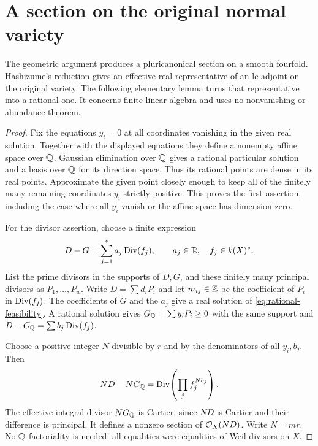 \section{A section on the original normal variety}\label{sec:conclusion}

The geometric argument produces a pluricanonical section on a smooth
fourfold. Hashizume's reduction gives an effective real representative
of an lc adjoint on the original variety. The following elementary
lemma turns that representative into a rational one. It concerns
finite linear algebra and uses no nonvanishing or abundance theorem.


\begin{proof}
Fix the equations $y_i=0$ at all coordinates vanishing in the given
real solution. Together with the displayed equations they define a
nonempty affine space over $\mathbb Q$. Gaussian elimination over $\mathbb Q$
gives a rational particular solution and a basis over $\mathbb Q$ for its
direction space. Thus its rational points are dense in its real
points. Approximate the given point closely enough to keep all of
the finitely many remaining coordinates $y_i$ strictly positive.
This proves the first assertion, including the case where all
$y_i$ vanish or the affine space has dimension zero.

For the divisor assertion, choose a finite expression
\[
 D-G=\sum_{j=1}^{v} a_j\operatorname{Div}(f_j),\qquad
 a_j\in\mathbb R,\quad f_j\in k(X)^*.
\]
List the prime divisors in the supports of
$D,G$, and these finitely many principal divisors as
$P_1,\ldots,P_w$. Write $D=\sum d_iP_i$ and let $m_{ij}\in\mathbb Z$
be the coefficient of $P_i$ in $\operatorname{Div}(f_j)$. The coefficients of
$G$ and the $a_j$ give a real solution of
\eqref{eq:rational-feasibility}. A rational solution gives
$G_{\mathbb Q}=\sum y_iP_i\ge0$ with the same support and
$D-G_{\mathbb Q}=\sum b_j\operatorname{Div}(f_j)$.

Choose a positive integer $N$ divisible by $r$ and by the
denominators of all $y_i,b_j$. Then
\[
 ND-NG_{\mathbb Q}=\operatorname{Div}\!\left(\prod_j f_j^{Nb_j}\right).
\]
The effective integral divisor $NG_{\mathbb Q}$ is Cartier, since $ND$
is Cartier and their difference is principal. It defines a nonzero
section of $\mathcal O_X(ND)$. Write $N=mr$. No $\mathbb Q$-factoriality is
needed: all equalities were equalities of Weil divisors on $X$.
\end{proof}

